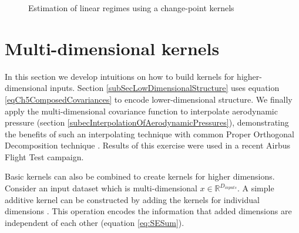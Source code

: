 \begin{figure}[!ht]
  \centering
    \quad
        \caption{Estimation of linear regimes using a change-point kernels}
        \label{figPosteriorChangePointKernel}
\end{figure}


\section{Multi-dimensional kernels}\label{secMultiDimensionalKernels}
In this section we develop intuitions on how to build kernels for higher-dimensional inputs. Section \ref{subSecLowDimensionalStructure} uses equation \ref{eqCh5ComposedCovariances} to encode lower-dimensional structure. We finally apply the multi-dimensional covariance function to interpolate aerodynamic pressure (section \ref{subecInterpolationOfAerodynamicPressures}), demonstrating the benefits of such an interpolating technique with common Proper Orthogonal Decomposition technique \cite{oatao18004}. Results of this exercise were used in a recent Airbus Flight Test campaign. 

Basic kernels can also be combined to create kernels for higher dimensions. Consider an input dataset which is multi-dimensional $x \in \mathbb{R}^{D_{inputs}}$. A simple additive kernel can be constructed by adding the kernels for individual dimensions \cite{hastie1990generalized}. This operation encodes the information that added dimensions are independent of each other (equation \ref{eq:SESum}). 

